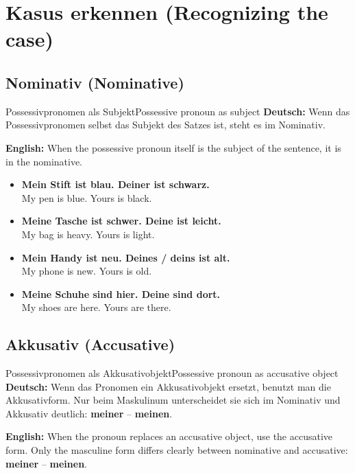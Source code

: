 \documentclass[a4paper,11pt]{article}
\newcommand{\GermanText}[1]{\textbf{Deutsch: }#1\par}
\newcommand{\EnglishText}[1]{{\small\color{SoftGray}\textbf{English: }#1\par}}
\newcommand{\ExampleItem}[2]{\item \textbf{#1}\\{\small\color{SoftGray}#2}}
\begin{document}
    \section{Kasus erkennen \textnormal{(Recognizing the case)}}

        \subsection{Nominativ \textnormal{(Nominative)}}

            \begin{grammarentry}{Possessivpronomen als Subjekt}{Possessive pronoun as subject}
                \GermanText{Wenn das Possessivpronomen selbst das Subjekt des Satzes ist, steht es im Nominativ.}
                \EnglishText{When the possessive pronoun itself is the subject of the sentence, it is in the nominative.}
            \end{grammarentry}

            \begin{exbox}
                \begin{itemize}
                    \ExampleItem{Mein Stift ist blau. Deiner ist schwarz.}{My pen is blue. Yours is black.}
                    \ExampleItem{Meine Tasche ist schwer. Deine ist leicht.}{My bag is heavy. Yours is light.}
                    \ExampleItem{Mein Handy ist neu. Deines / deins ist alt.}{My phone is new. Yours is old.}
                    \ExampleItem{Meine Schuhe sind hier. Deine sind dort.}{My shoes are here. Yours are there.}
                \end{itemize}
            \end{exbox}

        \subsection{Akkusativ \textnormal{(Accusative)}}

            \begin{grammarentry}{Possessivpronomen als Akkusativobjekt}{Possessive pronoun as accusative object}
                \GermanText{Wenn das Pronomen ein Akkusativobjekt ersetzt, benutzt man die Akkusativform. Nur beim Maskulinum unterscheidet sie sich im Nominativ und Akkusativ deutlich: \textbf{meiner} -- \textbf{meinen}.}
                \EnglishText{When the pronoun replaces an accusative object, use the accusative form. Only the masculine form differs clearly between nominative and accusative: \textbf{meiner} -- \textbf{meinen}.}
            \end{grammarentry}
\end{document}
